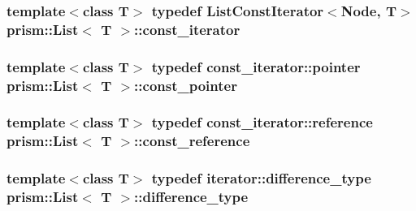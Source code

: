 \subsubsection[{\texorpdfstring{const\+\_\+iterator}{const_iterator}}]{\setlength{\rightskip}{0pt plus 5cm}template$<$class T$>$ typedef {\bf List\+Const\+Iterator}$<$Node, T$>$ {\bf prism\+::\+List}$<$ T $>$\+::{\bf const\+\_\+iterator}}\hypertarget{classprism_1_1_list_a038bd36af263a85110467528db8305d5}{}\label{classprism_1_1_list_a038bd36af263a85110467528db8305d5}
\subsubsection[{\texorpdfstring{const\+\_\+pointer}{const_pointer}}]{\setlength{\rightskip}{0pt plus 5cm}template$<$class T$>$ typedef {\bf const\+\_\+iterator\+::pointer} {\bf prism\+::\+List}$<$ T $>$\+::{\bf const\+\_\+pointer}}\hypertarget{classprism_1_1_list_ab7be76433c8a90f198e268a0918e8a6b}{}\label{classprism_1_1_list_ab7be76433c8a90f198e268a0918e8a6b}
\subsubsection[{\texorpdfstring{const\+\_\+reference}{const_reference}}]{\setlength{\rightskip}{0pt plus 5cm}template$<$class T$>$ typedef {\bf const\+\_\+iterator\+::reference} {\bf prism\+::\+List}$<$ T $>$\+::{\bf const\+\_\+reference}}\hypertarget{classprism_1_1_list_a908620eac035bd6d020d69919aeffcbe}{}\label{classprism_1_1_list_a908620eac035bd6d020d69919aeffcbe}
\subsubsection[{\texorpdfstring{difference\+\_\+type}{difference_type}}]{\setlength{\rightskip}{0pt plus 5cm}template$<$class T$>$ typedef {\bf iterator\+::difference\+\_\+type} {\bf prism\+::\+List}$<$ T $>$\+::{\bf difference\+\_\+type}}\hypertarget{classprism_1_1_list_a98f5a94db7ed98f032ee32ee34bbc8c8}{}\label{classprism_1_1_list_a98f5a94db7ed98f032ee32ee34bbc8c8}

